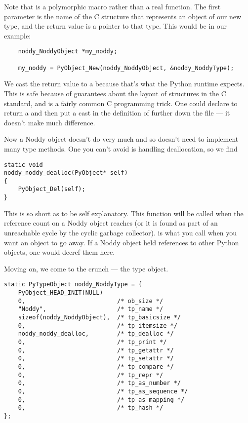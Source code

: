 Note that  is a polymorphic macro rather
than a real function.  The first parameter is the name of the C
structure that represents an object of our new type, and the return
value is a pointer to that type.  This would be
 in our example:

\begin{verbatim}
    noddy_NoddyObject *my_noddy;

    my_noddy = PyObject_New(noddy_NoddyObject, &noddy_NoddyType);
\end{verbatim}

We cast the return value to a  because that's what
the Python runtime expects.  This is safe because of guarantees about
the layout of structures in the C standard, and is a fairly common C
programming trick.  One could declare  to
return a  and then put a cast in the
definition of  further down the file --- it
doesn't make much difference.

Now a Noddy object doesn't do very much and so doesn't need to
implement many type methods.  One you can't avoid is handling
deallocation, so we find

\begin{verbatim}
static void
noddy_noddy_dealloc(PyObject* self)
{
    PyObject_Del(self);
}
\end{verbatim}

This is so short as to be self explanatory.  This function will be
called when the reference count on a Noddy object reaches  (or
it is found as part of an unreachable cycle by the cyclic garbage
collector).   is what you call when you want
an object to go away.  If a Noddy object held references to other
Python objects, one would decref them here.

Moving on, we come to the crunch --- the type object.

\begin{verbatim}
static PyTypeObject noddy_NoddyType = {
    PyObject_HEAD_INIT(NULL)
    0,                          /* ob_size */
    "Noddy",                    /* tp_name */
    sizeof(noddy_NoddyObject),  /* tp_basicsize */
    0,                          /* tp_itemsize */
    noddy_noddy_dealloc,        /* tp_dealloc */
    0,                          /* tp_print */
    0,                          /* tp_getattr */
    0,                          /* tp_setattr */
    0,                          /* tp_compare */
    0,                          /* tp_repr */
    0,                          /* tp_as_number */
    0,                          /* tp_as_sequence */
    0,                          /* tp_as_mapping */
    0,                          /* tp_hash */
};
\end{verbatim}

